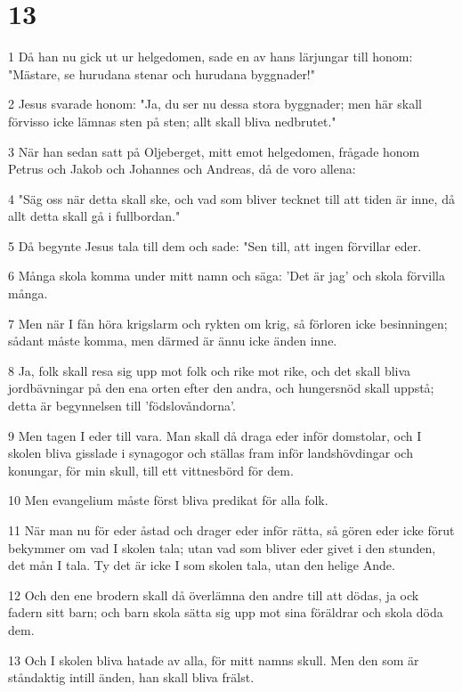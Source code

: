 \chapter{13}

\par 1 Då han nu gick ut ur helgedomen, sade en av hans lärjungar till honom: "Mästare, se hurudana stenar och hurudana byggnader!"
\par 2 Jesus svarade honom: "Ja, du ser nu dessa stora byggnader; men här skall förvisso icke lämnas sten på sten; allt skall bliva nedbrutet."
\par 3 När han sedan satt på Oljeberget, mitt emot helgedomen, frågade honom Petrus och Jakob och Johannes och Andreas, då de voro allena:
\par 4 "Säg oss när detta skall ske, och vad som bliver tecknet till att tiden är inne, då allt detta skall gå i fullbordan."
\par 5 Då begynte Jesus tala till dem och sade: "Sen till, att ingen förvillar eder.
\par 6 Många skola komma under mitt namn och säga: 'Det är jag' och skola förvilla många.
\par 7 Men när I fån höra krigslarm och rykten om krig, så förloren icke besinningen; sådant måste komma, men därmed är ännu icke änden inne.
\par 8 Ja, folk skall resa sig upp mot folk och rike mot rike, och det skall bliva jordbävningar på den ena orten efter den andra, och hungersnöd skall uppstå; detta är begynnelsen till 'födslovåndorna'.
\par 9 Men tagen I eder till vara. Man skall då draga eder inför domstolar, och I skolen bliva gisslade i synagogor och ställas fram inför landshövdingar och konungar, för min skull, till ett vittnesbörd för dem.
\par 10 Men evangelium måste först bliva predikat för alla folk.
\par 11 När man nu för eder åstad och drager eder inför rätta, så gören eder icke förut bekymmer om vad I skolen tala; utan vad som bliver eder givet i den stunden, det mån I tala. Ty det är icke I som skolen tala, utan den helige Ande.
\par 12 Och den ene brodern skall då överlämna den andre till att dödas, ja ock fadern sitt barn; och barn skola sätta sig upp mot sina föräldrar och skola döda dem.
\par 13 Och I skolen bliva hatade av alla, för mitt namns skull. Men den som är ståndaktig intill änden, han skall bliva frälst.
